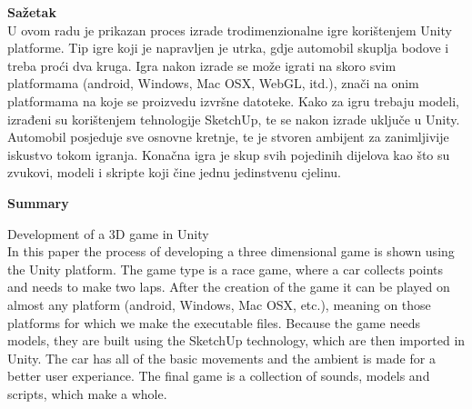 { \fontsize{16pt}{12pt}\selectfont\bfseries Sažetak}\\
U ovom radu je prikazan proces izrade trodimenzionalne igre korištenjem Unity platforme. Tip igre koji je napravljen je utrka, gdje automobil skuplja bodove i treba proći dva kruga. Igra nakon izrade se može igrati na skoro svim platformama (android, Windows, Mac OSX,  WebGL, itd.), znači na onim platformama na koje se proizvedu izvršne datoteke.  Kako za igru trebaju modeli, izrađeni su korištenjem tehnologije SketchUp, te se nakon izrade uključe u Unity. Automobil posjeduje sve osnovne kretnje, te je stvoren ambijent za zanimljivije iskustvo tokom igranja. Konačna igra je skup svih pojedinih dijelova kao što su zvukovi, modeli i skripte koji čine jednu jedinstvenu cjelinu.\par
\vspace{10mm}
{ \fontsize{16pt}{14pt}\selectfont\bfseries Summary}\par
{ \fontsize{14pt}{12pt}\selectfont Development of a 3D game in Unity}\\
In this paper the process of developing a three dimensional game is shown using the Unity platform. The game type is a race game, where a car collects points and needs to make two laps. After the creation of the game it can be played on almost any platform (android, Windows, Mac OSX, etc.), meaning on those platforms for which we make the executable files. Because the game needs models, they are built using the SketchUp technology, which are then imported in Unity. The car has all of the basic movements and the ambient is made for a better user experiance. The final game is a collection of sounds, models and scripts, which make a whole.
